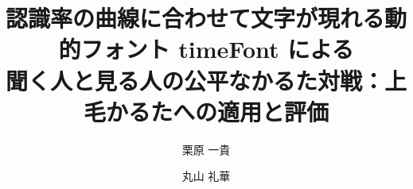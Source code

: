 \documentclass[submit]{ipsj}
\usepackage[dvipdfmx]{graphicx}
\usepackage{url}
\usepackage{amsmath}

\newif\ifFDfinal
\newif\ifFDplain
\providecommand{\figsdir}{figs}
\IfFileExists{fdmode.tex}{}{\FDfinalfalse\FDplainfalse}
\definecolor{fdblue}{rgb}{0.10,0.25,0.55}
\definecolor{fdred}{rgb}{0.75,0.10,0.10}
\newcommand{\fdtag}[2]{\textcolor{fdred}{\textbf{\footnotesize ［未来日記 #1・#2］}}}
\def\fdDone{done}
\newcommand{\fdcheck}[2]{\ifFDfinal\def\fdStatus{#2}\ifx\fdDone\fdStatus\else
  \ClassError{ipsj}{Future diary #1 is not done}{Resolve it or build in draft mode.}\fi\fi}
\newenvironment{fd}[4]{\fdcheck{#1}{#2}\ifFDfinal\else\ifFDplain\else\par\begingroup\color{fdblue}\fdtag{#1}{#2}\fi\fi}%
  {\ifFDfinal\else\ifFDplain\else\endgroup\par\fi\fi}
\newcommand{\fdcaption}[5]{\fdcheck{#1}{#2}\ifFDfinal\caption{#5}\else\ifFDplain\caption{#5}\else\caption{\fdtag{#1}{#2}#5}\fi\fi}

\setcounter{巻数}{68}
\setcounter{号数}{1}
\setcounter{page}{1}



\title{認識率の曲線に合わせて文字が現れる動的フォント timeFont による\\
聞く人と見る人の公平なかるた対戦：上毛かるたへの適用と評価}


\author{栗原 一貴}{Kazutaka Kurihara}{TSUDA}[kurihara@tsuda.ac.jp]
\author{丸山 礼華}{Reika Maruyama}{TSUDA}

